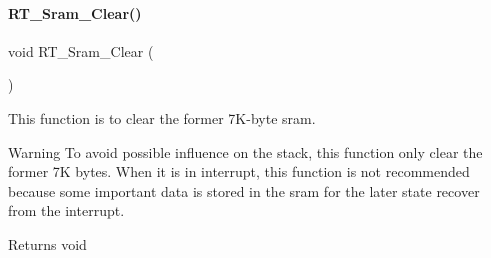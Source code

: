 \paragraph{\texorpdfstring{R\+T\+\_\+\+Sram\+\_\+\+Clear()}{RT\_Sram\_Clear()}}
{\footnotesize\ttfamily void R\+T\+\_\+\+Sram\+\_\+\+Clear (\begin{DoxyParamCaption}{ }\end{DoxyParamCaption})}



This function is to clear the former 7\+K-\/byte sram. 

\begin{DoxyWarning}{Warning}
To avoid possible influence on the stack, this function only clear the former 7K bytes. When it is in interrupt, this function is not recommended because some important data is stored in the sram for the later state recover from the interrupt. 
\end{DoxyWarning}
\begin{DoxyReturn}{Returns}
void 
\end{DoxyReturn}
